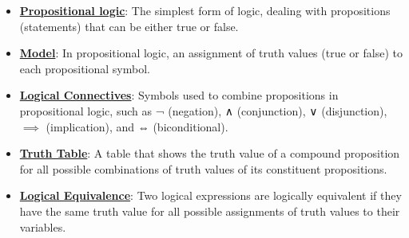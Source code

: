 \documentclass{article}%
\begin{document}
\begin{itemize}[leftmargin=*]%
\item \href{https://purdue.brightspace.com/d2l/common/assets/pdfjs-d2l-dist/1.0.14-legacy/web/viewer.html?file=\%2Fcontent\%2Fenforced\%2F1095467-wl.202510.CS.24300.001\%2F13L1-Logic.pdf\%3Fou\%3D1095467\&lang=en-us\&container=d2l-fileviewer-rendered-pdf\&fullscreen=d2l-fileviewer-rendered-pdf-dialog\&height=667#page=8}{\textbf{Propositional logic}}: The simplest form of logic, dealing with propositions (statements) that can be either true or false.%
\item \href{https://purdue.brightspace.com/d2l/common/assets/pdfjs-d2l-dist/1.0.14-legacy/web/viewer.html?file=\%2Fcontent\%2Fenforced\%2F1095467-wl.202510.CS.24300.001\%2F13L1-Logic.pdf\%3Fou\%3D1095467\&lang=en-us\&container=d2l-fileviewer-rendered-pdf\&fullscreen=d2l-fileviewer-rendered-pdf-dialog\&height=667#page=9}{\textbf{Model}}: In propositional logic, an assignment of truth values (true or false) to each propositional symbol.%
\item \href{https://purdue.brightspace.com/d2l/common/assets/pdfjs-d2l-dist/1.0.14-legacy/web/viewer.html?file=\%2Fcontent\%2Fenforced\%2F1095467-wl.202510.CS.24300.001\%2F13L1-Logic.pdf\%3Fou\%3D1095467\&lang=en-us\&container=d2l-fileviewer-rendered-pdf\&fullscreen=d2l-fileviewer-rendered-pdf-dialog\&height=667#page=8}{\textbf{Logical Connectives}}: Symbols used to combine propositions in propositional logic, such as ¬ (negation), ∧ (conjunction), ∨ (disjunction), $\implies$ (implication), and ⇔ (biconditional).%
\item \href{https://purdue.brightspace.com/d2l/common/assets/pdfjs-d2l-dist/1.0.14-legacy/web/viewer.html?file=\%2Fcontent\%2Fenforced\%2F1095467-wl.202510.CS.24300.001\%2F13L1-Logic.pdf\%3Fou\%3D1095467\&lang=en-us\&container=d2l-fileviewer-rendered-pdf\&fullscreen=d2l-fileviewer-rendered-pdf-dialog\&height=667#page=10}{\textbf{Truth Table}}: A table that shows the truth value of a compound proposition for all possible combinations of truth values of its constituent propositions.%
\item \href{https://purdue.brightspace.com/d2l/common/assets/pdfjs-d2l-dist/1.0.14-legacy/web/viewer.html?file=\%2Fcontent\%2Fenforced\%2F1095467-wl.202510.CS.24300.001\%2F13L1-Logic.pdf\%3Fou\%3D1095467\&lang=en-us\&container=d2l-fileviewer-rendered-pdf\&fullscreen=d2l-fileviewer-rendered-pdf-dialog\&height=667#page=12}{\textbf{Logical Equivalence}}: Two logical expressions are logically equivalent if they have the same truth value for all possible assignments of truth values to their variables.%

\end{itemize}
\end{document}
